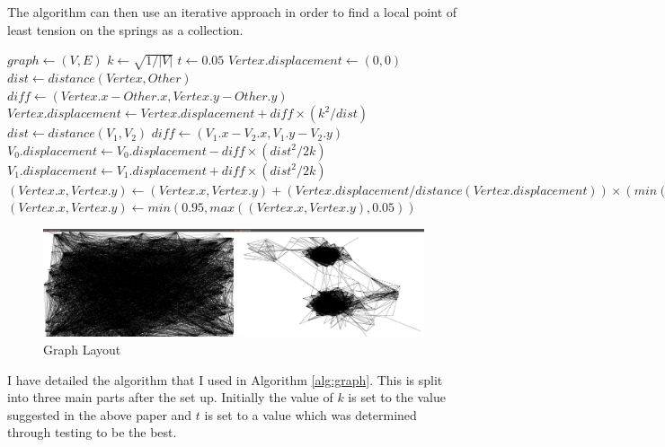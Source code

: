 \documentclass[12pt,a4paper]{article}
\begin{document}
The algorithm can then use an iterative approach in order to find a local point of least tension on the springs as a collection. 

\begin{algorithm}[htb]
\caption{Graph sprint-directed layout algorithm}
\label{alg:graph}
\begin{algorithmic}
\State $graph \gets (V, E)$ 
\State $k \gets \sqrt{1/|V|}$
\State $t \gets 0.05$
	\State $Vertex.displacement \gets (0,0)$
		\State $dist \gets distance(Vertex, Other)$ 
		\State $diff \gets (Vertex.x-Other.x, Vertex.y-Other.y)$
		\State $Vertex.displacement \gets Vertex.displacement + diff \times (k^{2}/dist)$
	\EndFor
\EndFor
{} 
	\State $dist \gets distance(V_{1}, V_{2})$
	\State $diff \gets (V_{1}.x-V_{2}.x, V_{1}.y-V_{2}.y)$
	\State $V_{0}.displacement \gets V_{0}.displacement - diff \times (dist^{2}/2k)$
	\State $V_{1}.displacement \gets V_{1}.displacement + diff \times (dist^{2}/2k)$
\EndFor
{}
	\State $(Vertex.x, Vertex.y) \gets (Vertex.x, Vertex.y) + (Vertex.displacement/distance(Vertex.displacement)) \times (min(distance(Vertex.displacement), t))$ 
	\State $(Vertex.x, Vertex.y) \gets min(0.95, max((Vertex.x, Vertex.y), 0.05))$ 
\EndFor
\end{algorithmic}
\end{algorithm}

\begin{figure}[htb]
\caption{Graph Layout}
\label{fig:layout}
\begin{center}
\includegraphics[scale=0.12]{Pygame.png}
\end{center}
\end{figure}

I have detailed the algorithm that I used in Algorithm \ref{alg:graph}. This is split into three main parts after the set up. Initially the value of $k$ is set to the value suggested in the above paper and $t$ is set to a value which was determined through testing to be the best.
\end{document}
